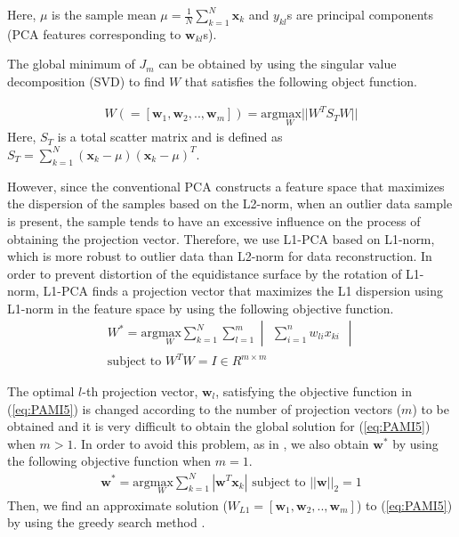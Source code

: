 \documentclass[10pt,letterpaper]{article}
\begin{document}
Here, $\mu$ is the sample mean $\mu=\frac{1}{N}\sum\limits_{k = 1}^{N} {\textbf{x}_k}$ and ${y}_{kl}$s are principal components (PCA features corresponding to $\textbf{w}_{kl}$s). 

The global minimum of $J_m$ can be obtained by using the singular value decomposition (SVD) \cite{golub1970singular} to find $W$ that satisfies the following object function. 

\begin{eqnarray}
\label{eq:IEEESensors4}
	W\left(=[\textbf{w}_1,\textbf{w}_2,..,\textbf{w}_m]\right)=\textrm{arg} \underset{W}{\textrm{max}}||W^{T}S_{T}W||
\end{eqnarray}
Here, ${S}_{T}$ is a total scatter matrix and is defined as $S_T = \sum\limits_{k=1}^{N}(\textbf{x}_k-\mu)(\textbf{x}_k-\mu)^T$.

  
However, since the conventional PCA constructs a feature space that maximizes the dispersion of the samples based on the L2-norm, when an outlier data sample is present, the sample tends to have an excessive influence on the process of obtaining the projection vector. 
Therefore, we use L1-PCA \cite{kwak2008principal} based on L1-norm, which is more robust to outlier data than L2-norm for data reconstruction. 
In order to prevent distortion of the equidistance surface by the rotation of L1-norm, L1-PCA finds a projection vector that maximizes the L1 dispersion using L1-norm in the feature space by using the following objective function. 
\begin{eqnarray}
\label{eq:PAMI5}
	W^* = \textrm{arg} \underset{W}{\textrm{max}}\sum\limits_{k=1}^{N}\sum\limits_{l=1}^{m}\begin{vmatrix}\sum\limits_{i=1}^{n}w_{li}x_{ki}\end{vmatrix} \nonumber\\ \textrm{subject to } W^TW = I \in R^{m \times m}
\end{eqnarray}  

The optimal $l$-th projection vector, $\textbf{w}_l$, satisfying the objective function in (\ref{eq:PAMI5}) is changed according to the number of projection vectors ($m$) to be obtained and it is very difficult to obtain the global solution for (\ref{eq:PAMI5}) when $m > 1$. 
In order to avoid this problem, as in \cite{kwak2008principal}, we also obtain $\textbf{w}^{*}$ by using the following objective function when $m = 1$.
\begin{eqnarray}
\label{eq:PAMI6}
	\textbf{w}^* = \textrm{arg} \underset{W}{\textrm{max}}\sum\limits_{k=1}^{N}|\textbf{w}^{T}\textbf{x}_k| \textrm{ subject to }||\textbf{w}||_2 = 1
\end{eqnarray}
Then, we find an approximate solution ($W_{L1} = [\textbf{w}_{1}, \textbf{w}_{2},..,\textbf{w}_{m}]$) to (\ref{eq:PAMI5}) by using the greedy search method \cite{kwak2008principal}.
\end{document}

